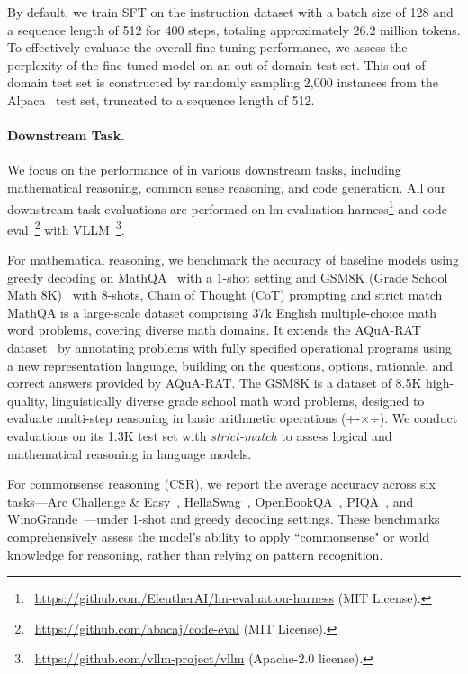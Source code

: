 By default, we train SFT on the instruction dataset with a batch size of 128 and a sequence length of 512 for 400 steps, totaling approximately 26.2 million tokens. 
To effectively evaluate the overall fine-tuning performance, we assess the perplexity of the fine-tuned model on an out-of-domain test set. This out-of-domain test set is constructed by randomly sampling 2,000 instances from the Alpaca~\citep{alpaca} test set, truncated to a sequence length of 512.

\paragraph{Downstream Task.}
We focus on the performance of \method in various downstream tasks, including mathematical reasoning, common sense reasoning, and code generation. All our downstream task evaluations are performed on lm-evaluation-harness\footnote{~\url{https://github.com/EleutherAI/lm-evaluation-harness} (MIT License).} and code-eval~\footnote{~\url{https://github.com/abacaj/code-eval} (MIT License).} with VLLM~\footnote{~\url{https://github.com/vllm-project/vllm} (Apache-2.0 license).}.

For mathematical reasoning, we benchmark the accuracy of baseline models using greedy decoding on MathQA~\citep{amini-etal-2019-mathqa} with a 1-shot setting and GSM8K (Grade School Math 8K)~\citep{cobbe2021gsm8k} with 8-shots, Chain of Thought (CoT) prompting and strict match
MathQA is a large-scale dataset comprising 37k English multiple-choice math word problems, covering diverse math domains. It extends the AQuA-RAT dataset~\citep{ling2017program} by annotating problems with fully specified operational programs using a new representation language, building on the questions, options, rationale, and correct answers provided by AQuA-RAT.
The GSM8K is a dataset of 8.5K high-quality, linguistically diverse grade school math word problems, designed to evaluate multi-step reasoning in basic arithmetic operations (+-×÷). We conduct evaluations on its 1.3K test set with \textit{strict-match} to assess logical and mathematical reasoning in language models.

For commonsense reasoning (CSR), we report the average accuracy across six tasks—Arc Challenge \& Easy~\citep{clark2018arc}, HellaSwag~\citep{zellers-etal-2019-hellaswag}, OpenBookQA~\citep{OpenBookQA2018}, PIQA~\citep{Bisk2020}, and WinoGrande~\citep{WinoGrande2021}—under 1-shot and greedy decoding settings. These benchmarks comprehensively assess the model’s ability to apply ``commonsense" or world knowledge for reasoning, rather than relying on pattern recognition.

